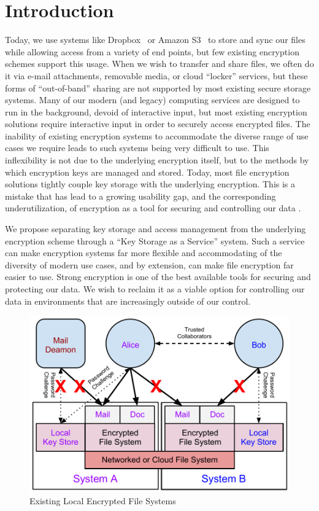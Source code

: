 \section{Introduction}
\label{sec:intro}

Today, we use systems like Dropbox~\cite{dropbox} or Amazon
S3~\cite{amazon-s3} to store and sync our files while allowing access
from a variety of end points, but few existing encryption schemes
support this usage. When we wish to transfer and share files, we often
do it via e-mail attachments, removable media, or cloud ``locker''
services, but these forms of ``out-of-band'' sharing are not supported
by most existing secure storage systems. Many of our modern (and
legacy) computing services are designed to run in the background,
devoid of interactive input, but most existing encryption solutions
require interactive input in order to securely access encrypted
files. The inability of existing encryption systems to accommodate the
diverse range of use cases we require leads to such systems being very
difficult to use. This inflexibility is not due to the underlying
encryption itself, but to the methods by which encryption keys are
managed and stored. Today, most file encryption solutions tightly
couple key storage with the underlying encryption. This is a mistake
that has lead to a growing usability gap, and the corresponding
underutilization, of encryption as a tool for securing and controlling
our data \cite{Whitten1999, Sweikata2009, Kher2005, Geambasu2011}.

We propose separating key storage and access management from the
underlying encryption scheme through a ``Key Storage as a Service''
system. Such a service can make encryption systems far more flexible
and accommodating of the diversity of modern use cases, and by
extension, can make file encryption far easier to use. Strong
encryption is one of the best available tools for securing and
protecting our data. We wish to reclaim it as a viable option for
controlling our data in environments that are increasingly outside of
our control.

\begin{figure}[!tb]
  \centering
  \includegraphics[width=\columnwidth]{./include/Problem-Layered.pdf}
  \caption{Existing Local Encrypted File Systems}
  \label{fig:problem-layered}
\end{figure}

